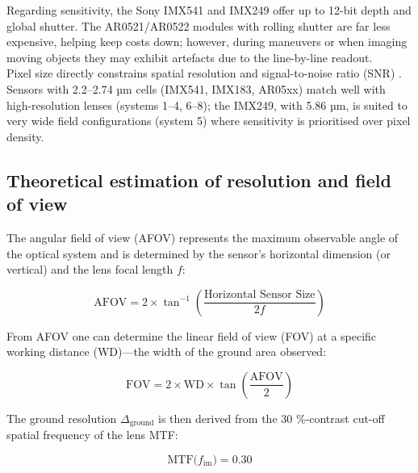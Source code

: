 \noindent Regarding sensitivity, the Sony IMX541 and IMX249 offer up to 12-bit
depth and global shutter.  The AR0521/AR0522 modules with rolling
shutter are far less expensive, helping keep costs down; however, during
maneuvers or when imaging moving objects they may exhibit artefacts due
to the line-by-line readout.\\

\noindent Pixel size directly constrains spatial resolution and signal-to-noise
ratio (SNR) \cite{Chen2000HowBe}.  Sensors with 2.2–2.74 µm cells
(IMX541, IMX183, AR05xx) match well with high-resolution lenses
(systems 1–4, 6–8); the IMX249, with 5.86 µm, is suited to very wide
field configurations (system 5) where sensitivity is prioritised over
pixel density.\\

\subsection{Theoretical estimation of resolution and field of view}
\label{sec:res_sim}

The angular field of view (AFOV) represents the maximum observable
angle of the optical system and is determined by the sensor’s horizontal
dimension (or vertical) and the lens focal length \(f\):

\begin{equation}
    \label{eq:afov}
    \mathrm{AFOV}=2 \times \tan^{-1}\!\left(\frac{\text{Horizontal Sensor Size}}{2f}\right)
\end{equation}

\noindent From AFOV one can determine the linear field of view (FOV) at a specific
working distance (WD)—the width of the ground area observed:

\begin{equation}
    \mathrm{FOV}=2 \times \mathrm{WD} \times \tan \!\left(\frac{\mathrm{AFOV}}{2}\right)
\end{equation}

\noindent The ground resolution \(\Delta_{\text{ground}}\) is then derived from the
30 \%-contrast cut-off spatial frequency of the lens MTF:

\begin{equation}
    \text{MTF}\bigl(f_{\text{im}}\bigr)=0.30
    \label{eq:mtf_cutoff}
\end{equation}

